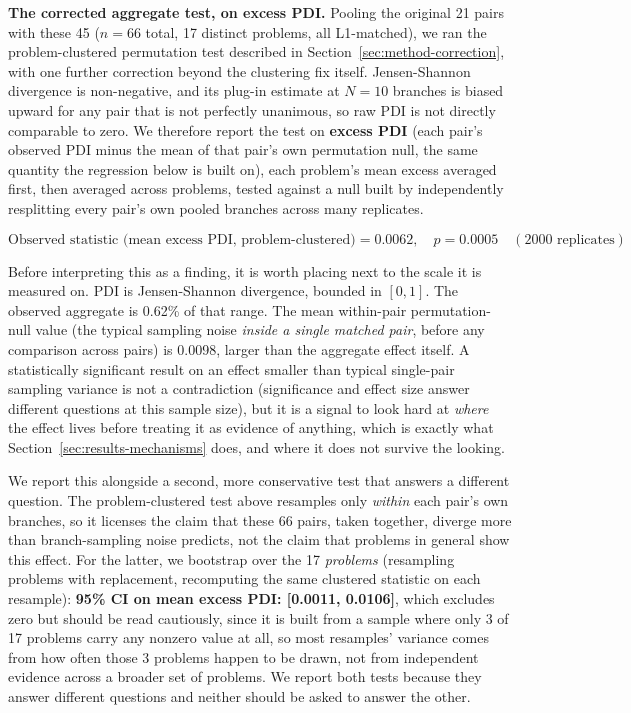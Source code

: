 \documentclass{article}
\begin{document}
\textbf{The corrected aggregate test, on excess PDI.} Pooling the original 21 pairs with these 45 ($n=66$ total, 17 distinct problems, all L1-matched), we ran the problem-clustered permutation test described in Section~\ref{sec:method-correction}, with one further correction beyond the clustering fix itself. Jensen-Shannon divergence is non-negative, and its plug-in estimate at $N=10$ branches is biased upward for any pair that is not perfectly unanimous, so raw PDI is not directly comparable to zero. We therefore report the test on \textbf{excess PDI} (each pair's observed PDI minus the mean of that pair's own permutation null, the same quantity the regression below is built on), each problem's mean excess averaged first, then averaged across problems, tested against a null built by independently resplitting every pair's own pooled branches across many replicates.

\begin{equation}
\text{Observed statistic (mean excess PDI, problem-clustered)} = 0.0062, \quad p = 0.0005 \quad (2000 \text{ replicates})
\end{equation}

Before interpreting this as a finding, it is worth placing next to the scale it is measured on. PDI is Jensen-Shannon divergence, bounded in $[0,1]$. The observed aggregate is 0.62\% of that range. The mean within-pair permutation-null value (the typical sampling noise \emph{inside a single matched pair}, before any comparison across pairs) is 0.0098, larger than the aggregate effect itself. A statistically significant result on an effect smaller than typical single-pair sampling variance is not a contradiction (significance and effect size answer different questions at this sample size), but it is a signal to look hard at \emph{where} the effect lives before treating it as evidence of anything, which is exactly what Section~\ref{sec:results-mechanisms} does, and where it does not survive the looking.

We report this alongside a second, more conservative test that answers a different question. The problem-clustered test above resamples only \emph{within} each pair's own branches, so it licenses the claim that these 66 pairs, taken together, diverge more than branch-sampling noise predicts, not the claim that problems in general show this effect. For the latter, we bootstrap over the 17 \emph{problems} (resampling problems with replacement, recomputing the same clustered statistic on each resample): \textbf{95\% CI on mean excess PDI: [0.0011, 0.0106]}, which excludes zero but should be read cautiously, since it is built from a sample where only 3 of 17 problems carry any nonzero value at all, so most resamples' variance comes from how often those 3 problems happen to be drawn, not from independent evidence across a broader set of problems. We report both tests because they answer different questions and neither should be asked to answer the other.
\end{document}
